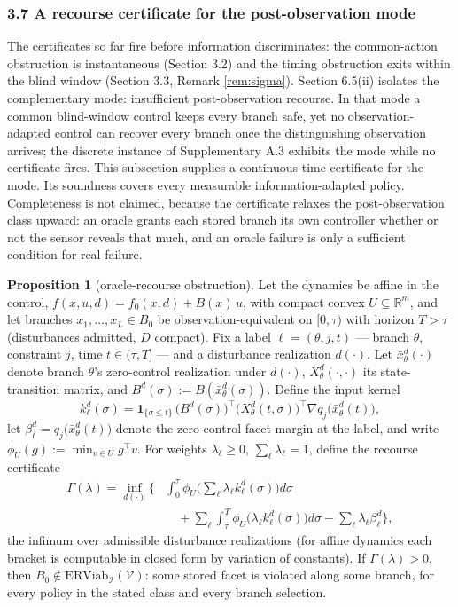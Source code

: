 \documentclass[10pt,twocolumn]{article}
\theoremstyle{definition}
\newtheorem{proposition}{Proposition}
\begin{document}
\subsubsection{3.7 A recourse certificate for the post-observation
mode}\label{recourse-certificate}

The certificates so far fire before information discriminates: the
common-action obstruction is instantaneous (Section 3.2) and the timing
obstruction exits within the blind window (Section 3.3, Remark
\ref{rem:sigma}). Section 6.5(ii) isolates the complementary mode:
insufficient post-observation recourse. In that mode a common blind-window
control keeps every branch safe, yet no observation-adapted control can
recover every branch once the distinguishing observation arrives; the discrete
instance of Supplementary A.3 exhibits the mode while no certificate fires.
This subsection supplies a continuous-time certificate for the mode. Its
soundness covers every measurable information-adapted policy. Completeness is
not claimed, because the certificate relaxes the post-observation class
upward: an oracle grants each stored branch its own controller whether or not
the sensor reveals that much, and an oracle failure is only a sufficient
condition for real failure.

\begin{proposition}[oracle-recourse obstruction]\label{prop:recourse}
Let the dynamics be affine in the control,
\(f(x,u,d) = f_0(x,d) + B(x)\,u\), with compact convex
\(U \subseteq \mathbb{R}^m\), and let branches
\(x_1, \dots, x_L \in B_0\) be observation-equivalent on \([0, \tau)\) with
horizon \(T > \tau\) (disturbances admitted, \(D\) compact). Fix a label
\(\ell = (\theta, j, t)\) --- branch \(\theta\), constraint \(j\), time
\(t \in (\tau, T]\) --- and a disturbance realization \(d(\cdot)\). Let
\(\bar x_\theta^d(\cdot)\) denote branch \(\theta\)'s zero-control
realization under \(d(\cdot)\), \(X_\theta^d(\cdot, \cdot)\) its
state-transition matrix, and \(B^d(\sigma) := B(\bar x_\theta^d(\sigma))\).
Define the input kernel
\[k_\ell^d(\sigma) = \mathbf{1}_{\{\sigma \le t\}}\,
\big(B^d(\sigma)\big)^{\top}
\big(X_\theta^d(t, \sigma)\big)^{\top}
\nabla q_j\big(\bar x_\theta^d(t)\big),\]
let \(\beta_\ell^d = q_j\big(\bar x_\theta^d(t)\big)\) denote the
zero-control facet margin at the label, and write
\(\phi_U(g) := \min_{v \in U} g^{\top} v\). For weights
\(\lambda_\ell \ge 0\), \(\sum_\ell \lambda_\ell = 1\), define the
recourse certificate
\[\begin{aligned}
\Gamma(\lambda) = \inf_{d(\cdot)} \Big\{ &\int_0^{\tau}
\phi_U\Big(\sum_{\ell} \lambda_\ell k_\ell^d(\sigma)\Big) d\sigma \\
&\quad + \sum_{\ell} \int_{\tau}^{T}
\phi_U\big(\lambda_\ell k_\ell^d(\sigma)\big) d\sigma
- \sum_{\ell} \lambda_\ell \beta_\ell^d \Big\},
\end{aligned}\]
the infimum over admissible disturbance realizations (for affine dynamics
each bracket is computable in closed form by variation of constants). If
\(\Gamma(\lambda) > 0\), then
\(B_0 \notin \mathrm{ERViab}_{\mathcal{I}}(\mathcal{V})\): some stored
facet is violated along some branch, for every policy in the stated class and
every branch selection.
\end{proposition}
\end{document}
